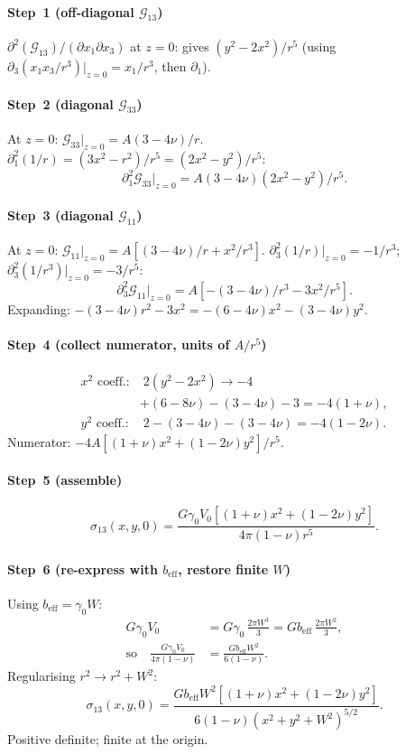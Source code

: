 \documentclass[3p]{elsarticle}
\newcommand{\gz}{\gamma_0}
\newcommand{\beff}{b_\mathrm{eff}}
\begin{document}
\paragraph{Step~1 (off-diagonal $\mathcal G_{13}$)}
$\partial^2(\mathcal G_{13})/(\partial x_1\partial x_3)$ at $z=0$:
gives $(y^2-2x^2)/r^5$ (using $\partial_3(x_1x_3/r^3)|_{z=0}
=x_1/r^3$, then $\partial_1$).

\paragraph{Step~2 (diagonal $\mathcal G_{33}$)}
At $z=0$: $\mathcal G_{33}|_{z=0}=A(3-4\nu)/r$.
$\partial_1^2(1/r)=(3x^2-r^2)/r^5=(2x^2-y^2)/r^5$:
\[
  \partial_1^2\mathcal G_{33}\big|_{z=0}=A(3-4\nu)(2x^2-y^2)/r^5.
\]

\paragraph{Step~3 (diagonal $\mathcal G_{11}$)}
At $z=0$: $\mathcal G_{11}|_{z=0}=A[(3-4\nu)/r+x^2/r^3]$.
$\partial_3^2(1/r)|_{z=0}=-1/r^3$;
$\partial_3^2(1/r^3)|_{z=0}=-3/r^5$:
\[
  \partial_3^2\mathcal G_{11}\big|_{z=0}=A[-(3-4\nu)/r^3-3x^2/r^5].
\]
Expanding: $-(3-4\nu)r^2-3x^2=-(6-4\nu)x^2-(3-4\nu)y^2$.

\paragraph{Step~4 (collect numerator, units of $A/r^5$)}
\begin{align*}
  x^2\text{ coeff.:}&\;2(y^2\!-\!2x^2)\to-4\\
  &+(6\!-\!8\nu)-(3\!-\!4\nu)-3=-4(1+\nu),\\
  y^2\text{ coeff.:}&\;2-(3\!-\!4\nu)-(3\!-\!4\nu)=-4(1-2\nu).
\end{align*}
Numerator: $-4A[(1+\nu)x^2+(1-2\nu)y^2]/r^5$.

\paragraph{Step~5 (assemble)}
\[
  \sigma_{13}(x,y,0)=\frac{G\gz V_0[(1+\nu)x^2+(1-2\nu)y^2]}
  {4\pi(1-\nu)r^5}.
\]

\paragraph{Step~6 (re-express with $\beff$, restore finite $W$)}
Using $\beff=\gz W$:
\begin{align*}
  G\gz V_0&=G\gz\,\tfrac{2\pi W^3}{3}=G\beff\,\tfrac{2\pi W^2}{3},\\
  \text{so}\quad\frac{G\gz V_0}{4\pi(1-\nu)}&=\frac{G\beff W^2}{6(1-\nu)}.
\end{align*}
Regularising $r^2\to r^2+W^2$:
\begin{equation}
  \boxed{\sigma_{13}(x,y,0)=
  \frac{G\beff W^2[(1+\nu)x^2+(1-2\nu)y^2]}
  {6(1-\nu)(x^2+y^2+W^2)^{5/2}}.}
  \label{eq:glideplane}
\end{equation}
Positive definite; finite at the origin.
\end{document}
